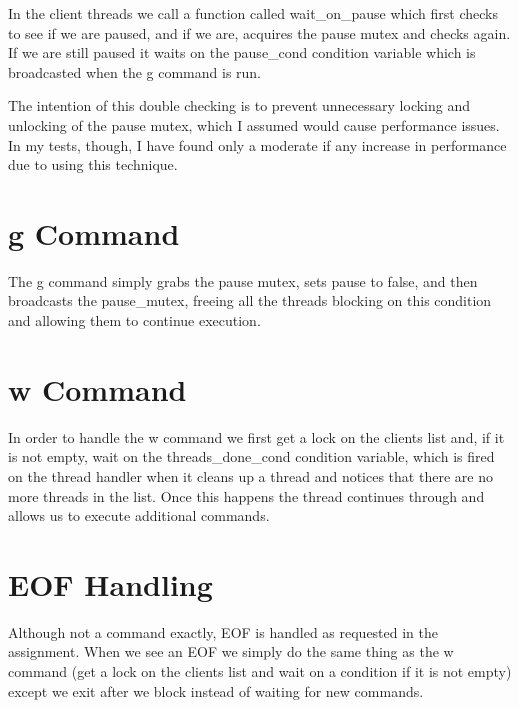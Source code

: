 \documentclass[paper=a4, fontsize=11pt]{scrartcl} %
\numberwithin{equation}{section} %
\numberwithin{figure}{section} %
\numberwithin{table}{section} %
\begin{document}
In the client threads we call a function called wait\_on\_pause which first checks to see if we are paused, and if we are, acquires the pause mutex and checks again.  If we are still paused it waits on the pause\_cond condition variable which is broadcasted when the g command is run.

The intention of this double checking is to prevent unnecessary locking and unlocking of the pause mutex, which I assumed would cause performance issues.  In my tests, though, I have found only a moderate if any increase in performance due to using this technique.

\section{g Command}

The g command simply grabs the pause mutex, sets pause to false, and then broadcasts the pause\_mutex, freeing all the threads blocking on this condition and allowing them to continue execution.

\section{w Command}

In order to handle the w command we first get a lock on the clients list and, if it is not empty, wait on the threads\_done\_cond condition variable, which is fired on the thread handler when it cleans up a thread and notices that there are no more threads in the list.  Once this happens the thread continues through and allows us to execute additional commands.

\section{EOF Handling}

Although not a command exactly, EOF is handled as requested in the assignment.  When we see an EOF we simply do the same thing as the w command (get a lock on the clients list and wait on a condition if it is not empty) except we exit after we block instead of waiting for new commands.
\end{document}
